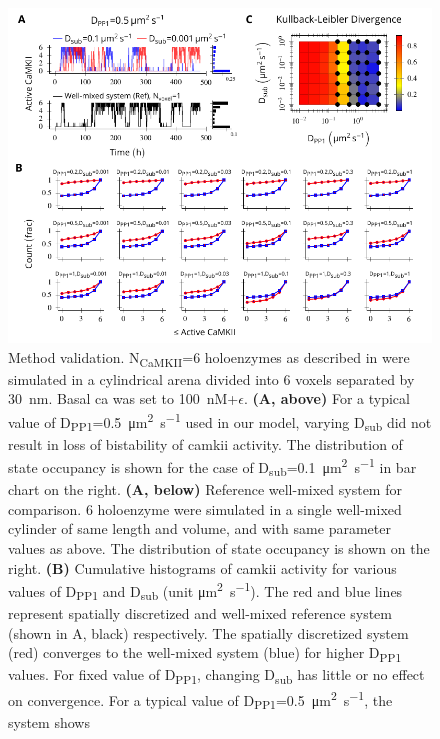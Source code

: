 \documentclass[9pt,lineno,doublespacing]{elife}
\newcommand\SUB[2]{#1\textsubscript{#2}}
\begin{document}
\begin{figure}[ht!]
    \includegraphics[width=12cm]{./PaperFigures/elifeFigure8/figure_su_long_term_effect.pdf}
    \caption{Method validation. \SUB{N}{CaMKII}=6 holoenzymes as described in
         were simulated in a cylindrical arena
        divided into 6 voxels separated by \SI{30}{\nano\meter}. Basal \gls{ca}
        was set to \SI{100}{\nano M}+$\epsilon$.  
        \textbf{(A, above)} For a typical value of
        \SUB{D}{PP1}=\SI{0.5}{\micro\meter\squared\per\second} used in our
        model, varying \SUB{D}{sub} did not result in loss of bistability of
        \gls{camkii} activity. The distribution of state occupancy is shown for
        the case of \SUB{D}{sub}=\SI{0.1}{\micro\meter\squared\per\second} in
        bar chart on the right.  \textbf{(A, below)} Reference well-mixed system
        for comparison. 6 holoenzyme were simulated in a single well-mixed
        cylinder of same length and volume, and with same parameter values as
        above. The distribution of state occupancy is shown on the right.
        \textbf{(B)} Cumulative histograms of \gls{camkii} activity for various
        values of \SUB{D}{PP1} and \SUB{D}{sub} (unit
        \si{\micro\meter\squared\per\second}). The red and blue lines represent
        spatially discretized and well-mixed reference system (shown in A,
        black) respectively. The spatially discretized system (red) converges to
        the well-mixed system (blue) for higher \SUB{D}{PP1} values.  For fixed
        value of \SUB{D}{PP1}, changing \SUB{D}{sub} has little or no effect on
        convergence. For a typical value of
        \SUB{D}{PP1}=\SI{0.5}{\micro\meter\squared\per\second}, the system shows
}
\end{figure}
\end{document}
